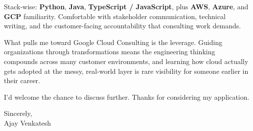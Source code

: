 \documentclass[letterpaper,11pt]{article}
\begin{document}
Stack-wise: \textbf{Python}, \textbf{Java}, \textbf{TypeScript / JavaScript}, plus \textbf{AWS}, \textbf{Azure}, and \textbf{GCP} familiarity. Comfortable with stakeholder communication, technical writing, and the customer-facing accountability that consulting work demands.

What pulls me toward Google Cloud Consulting is the leverage. Guiding organizations through transformations means the engineering thinking compounds across many customer environments, and learning how cloud actually gets adopted at the messy, real-world layer is rare visibility for someone earlier in their career.

I'd welcome the chance to discuss further. Thanks for considering my application.

\vspace{12pt}
Sincerely, \\
Ajay Venkatesh
\end{document}
